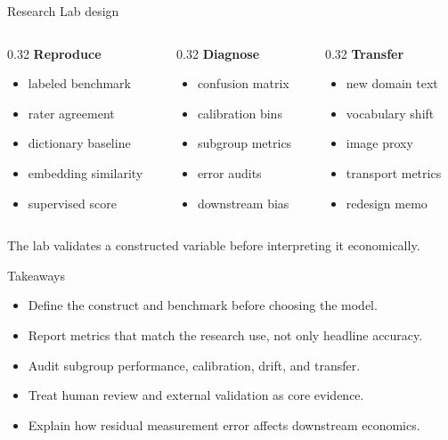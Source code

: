 \documentclass[aspectratio=169,11pt]{beamer}
\newcommand{\1}{\mathbf{1}}
\begin{document}
\begin{frame}{Research Lab design}
\begin{columns}[T,onlytextwidth]
\begin{column}{0.32\linewidth}
\textbf{Reproduce}
\begin{itemize}
    \item labeled benchmark
    \item rater agreement
    \item dictionary baseline
    \item embedding similarity
    \item supervised score
\end{itemize}
\end{column}
\begin{column}{0.32\linewidth}
\textbf{Diagnose}
\begin{itemize}
    \item confusion matrix
    \item calibration bins
    \item subgroup metrics
    \item error audits
    \item downstream bias
\end{itemize}
\end{column}
\begin{column}{0.32\linewidth}
\textbf{Transfer}
\begin{itemize}
    \item new domain text
    \item vocabulary shift
    \item image proxy
    \item transport metrics
    \item redesign memo
\end{itemize}
\end{column}
\end{columns}

\medskip
The lab validates a constructed variable before interpreting it economically.
\end{frame}

\begin{frame}{Takeaways}
\begin{itemize}
    \item Define the construct and benchmark before choosing the model.
    \item Report metrics that match the research use, not only headline accuracy.
    \item Audit subgroup performance, calibration, drift, and transfer.
    \item Treat human review and external validation as core evidence.
    \item Explain how residual measurement error affects downstream economics.
\end{itemize}
\end{frame}
\end{document}
